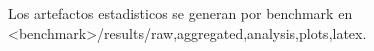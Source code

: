 Los artefactos estadisticos se generan por benchmark en <benchmark>/results/{raw,aggregated,analysis,plots,latex}.
